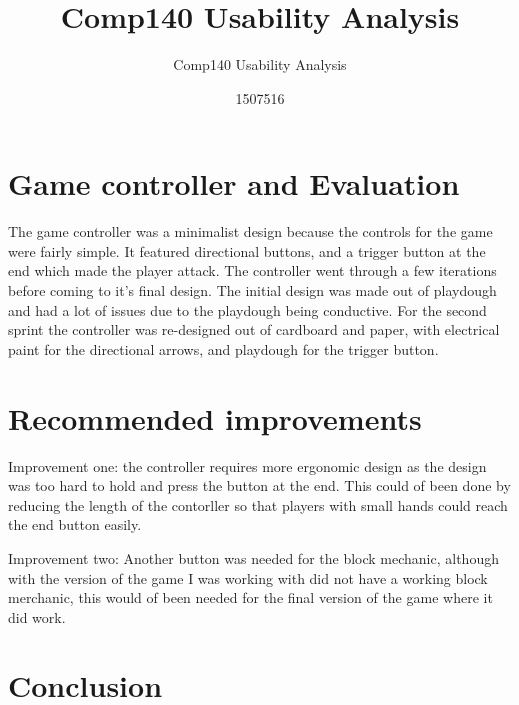 \documentclass{scrartcl}
\title{Comp140 Usability Analysis}
\subtitle{Comp140 Usability Analysis}
\author{1507516}
\begin{document}
\maketitle

\abstract{}

\section{Game controller and Evaluation}

The game controller was a minimalist design because the controls for the game were fairly simple. It featured directional buttons, and a trigger button at the end which made the player attack. The controller went through a few iterations before coming to it's final design. The initial design was made out of playdough and had a lot of issues due to the playdough being conductive. For the second sprint the controller was re-designed out of cardboard and paper, with electrical paint for the directional arrows, and playdough for the trigger button.

\section{Recommended improvements}

Improvement one:
the controller requires more ergonomic design as the design was too hard to hold and press the button at the end. This could of been done by reducing the length of the contorller so that players with small hands could reach the end button easily.

Improvement two:
Another button was needed for the block mechanic, although with the version of the game I was working with did not have a working block merchanic, this would of been needed for the final version of the game where it did work.


\section{Conclusion}



\end{document}
